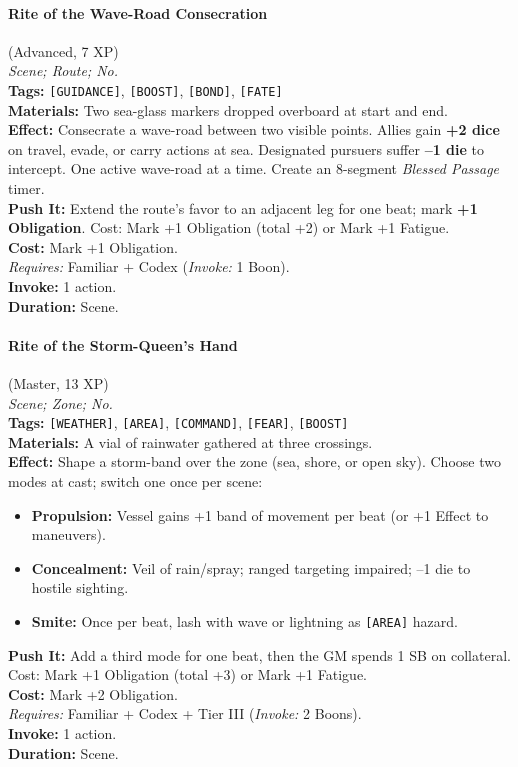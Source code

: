 \paragraph{Rite of the Wave-Road Consecration} (Advanced, 7 XP) \hfill \\
\emph{Scene; Route; No.} \\
\textbf{Tags:} \texttt{[GUIDANCE]}, \texttt{[BOOST]}, \texttt{[BOND]}, \texttt{[FATE]} \\
\textbf{Materials:} Two sea-glass markers dropped overboard at start and end. \\
\textbf{Effect:} Consecrate a wave-road between two visible points. Allies gain \textbf{+2 dice} on travel, evade, or carry actions at sea. Designated pursuers suffer \textbf{--1 die} to intercept. One active wave-road at a time. Create an 8-segment \textit{Blessed Passage} timer. \\
\textbf{Push It:} Extend the route's favor to an adjacent leg for one beat; mark \textbf{+1 Obligation}. Cost: Mark +1 Obligation (total +2) or Mark +1 Fatigue. \\
\textbf{Cost:} Mark +1 Obligation. \\
\textit{Requires:} Familiar + Codex (\textit{Invoke:} 1 Boon). \\
\textbf{Invoke:} 1 action. \\
\textbf{Duration:} Scene.

\paragraph{Rite of the Storm-Queen's Hand} (Master, 13 XP) \hfill \\
\emph{Scene; Zone; No.} \\
\textbf{Tags:} \texttt{[WEATHER]}, \texttt{[AREA]}, \texttt{[COMMAND]}, \texttt{[FEAR]}, \texttt{[BOOST]} \\
\textbf{Materials:} A vial of rainwater gathered at three crossings. \\
\textbf{Effect:} Shape a storm-band over the zone (sea, shore, or open sky). Choose two modes at cast; switch one once per scene:
\begin{itemize}
  \item \textbf{Propulsion:} Vessel gains +1 band of movement per beat (or +1 Effect to maneuvers).
  \item \textbf{Concealment:} Veil of rain/spray; ranged targeting impaired; --1 die to hostile sighting.
  \item \textbf{Smite:} Once per beat, lash with wave or lightning as \texttt{[AREA]} hazard.
\end{itemize}
\textbf{Push It:} Add a third mode for one beat, then the GM spends 1 SB on collateral. Cost: Mark +1 Obligation (total +3) or Mark +1 Fatigue. \\
\textbf{Cost:} Mark +2 Obligation. \\
\textit{Requires:} Familiar + Codex + Tier III (\textit{Invoke:} 2 Boons). \\
\textbf{Invoke:} 1 action. \\
\textbf{Duration:} Scene.

